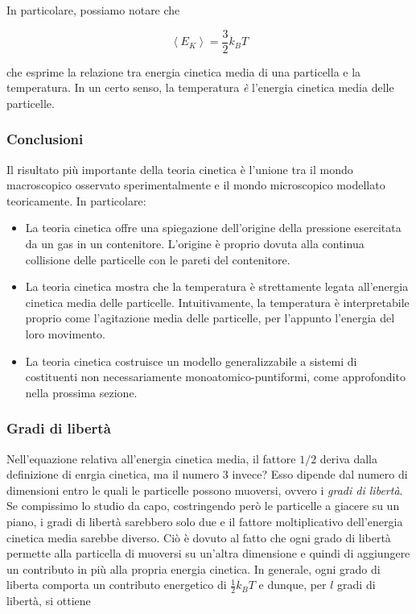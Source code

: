 In particolare, possiamo notare che

\[ \left\langle E_K \right\rangle = \frac{3}{2}k_B T \]

\noindent che esprime la relazione tra energia cinetica media di una
particella e la temperatura. In un certo senso, la temperatura \textit{è}
l'energia cinetica media delle particelle.

\subsubsection*{Conclusioni}
Il risultato più importante della teoria cinetica è l'unione tra
il mondo macroscopico osservato sperimentalmente e il mondo microscopico
modellato teoricamente. In particolare:
\begin{itemize}
    \item La teoria cinetica offre una spiegazione dell'origine della
    pressione esercitata da un gas in un contenitore. L'origine è proprio
    dovuta alla continua collisione delle particelle con le pareti
    del contenitore.

    \item La teoria cinetica mostra che la temperatura è strettamente
    legata all'energia cinetica media delle particelle. Intuitivamente,
    la temperatura è interpretabile proprio come l'agitazione media
    delle particelle, per l'appunto l'energia del loro movimento.

    \item La teoria cinetica costruisce un modello generalizzabile
    a sistemi di costituenti non necessariamente monoatomico-puntiformi,
    come approfondito nella prossima sezione.
\end{itemize}

\subsubsection*{Gradi di libertà}
Nell'equazione relativa all'energia cinetica media,
il fattore $1/2$ deriva dalla definizione di enrgia cinetica, ma
il numero $3$ invece? Esso dipende dal numero di dimensioni entro
le quali le particelle possono muoversi, ovvero i \textit{gradi di
libertà}. Se compissimo lo studio da capo, costringendo però le particelle
a giacere su un piano, i gradi di libertà sarebbero solo due e il fattore
moltiplicativo
dell'energia cinetica media sarebbe diverso. Ciò è dovuto al fatto
che ogni grado di libertà permette alla particella di muoversi su
un'altra dimensione e quindi di aggiungere un contributo in più alla
propria energia cinetica. In generale, ogni grado di
liberta comporta un contributo energetico di $\frac12k_BT$ e
dunque, per $l$ gradi di libertà, si ottiene

